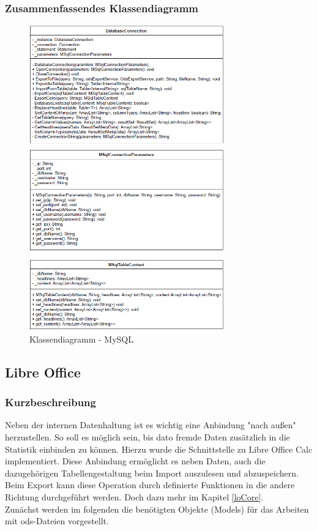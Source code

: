 \subsubsection{Zusammenfassendes Klassendiagramm}
\label{mysqlClasses}
\begin{figure}[h]
\centering
\includegraphics[width=0.75\textwidth]{images/mysql.png}
\caption{Klassendiagramm - MySQL}
\end{figure}

\subsection{Libre Office}
\label{subsectionLibreOffice}

\subsubsection{Kurzbeschreibung}
\label{loDescription}
Neben der internen Datenhaltung ist es wichtig eine Anbindung "nach außen" herzustellen. So soll es möglich sein, bis dato fremde Daten zusätzlich in die Statistik einbinden zu können. Hierzu wurde die Schnittstelle zu Libre Office Calc implementiert. Diese Anbindung ermöglicht es neben Daten, auch die dazugehörigen Tabellengestaltung beim Import auszulesen und abzuspeichern. Beim Export kann diese Operation durch definierte Funktionen in die andere Richtung durchgeführt werden. Doch dazu mehr im Kapitel \ref{loCore}.\\
Zunächst werden im folgenden die benötigten Objekte (Models) für das Arbeiten mit ods-Dateien vorgestellt.

